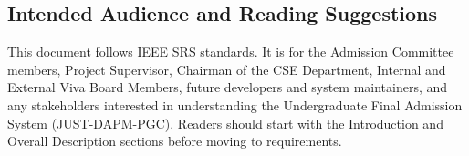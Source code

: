 \subsection{Intended Audience and Reading Suggestions}

This document follows IEEE SRS standards. It is for the Admission Committee members, Project Supervisor, Chairman of the CSE Department, Internal and External Viva Board Members, future developers and system maintainers, and any stakeholders interested in understanding the Undergraduate Final Admission System (JUST-DAPM-PGC). Readers should start with the Introduction and Overall Description sections before moving to requirements.